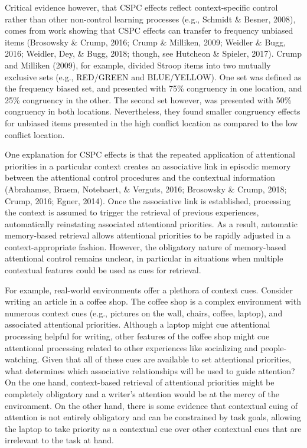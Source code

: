 \documentclass[english,,man,floatsintext]{apa6}
\begin{document}
Critical evidence however, that CSPC effects reflect context-specific control rather than other non-control learning processes (e.g., Schmidt \& Besner, 2008), comes from work showing that CSPC effects can transfer to frequency unbiased items (Brosowsky \& Crump, 2016; Crump \& Milliken, 2009; Weidler \& Bugg, 2016; Weidler, Dey, \& Bugg, 2018; though, see Hutcheon \& Spieler, 2017). Crump and Milliken (2009), for example, divided Stroop items into two mutually exclusive sets (e.g., RED/GREEN and BLUE/YELLOW). One set was defined as the frequency biased set, and presented with 75\% congruency in one location, and 25\% congruency in the other. The second set however, was presented with 50\% congruency in both locations. Nevertheless, they found smaller congruency effects for unbiased items presented in the high conflict location as compared to the low conflict location.

One explanation for CSPC effects is that the repeated application of attentional priorities in a particular context creates an associative link in episodic memory between the attentional control procedures and the contextual information (Abrahamse, Braem, Notebaert, \& Verguts, 2016; Brosowsky \& Crump, 2018; Crump, 2016; Egner, 2014). Once the associative link is established, processing the context is assumed to trigger the retrieval of previous experiences, automatically reinstating associated attentional priorities. As a result, automatic memory-based retrieval allows attentional priorities to be rapidly adjusted in a context-appropriate fashion. However, the obligatory nature of memory-based attentional control remains unclear, in particular in situations when multiple contextual features could be used as cues for retrieval.

For example, real-world environments offer a plethora of context cues. Consider writing an article in a coffee shop. The coffee shop is a complex environment with numerous context cues (e.g., pictures on the wall, chairs, coffee, laptop), and associated attentional priorities. Although a laptop might cue attentional processing helpful for writing, other features of the coffee shop might cue attentional processing related to other experiences like socializing and people-watching. Given that all of these cues are available to set attentional priorities, what determines which associative relationships will be used to guide attention? On the one hand, context-based retrieval of attentional priorities might be completely obligatory and a writer's attention would be at the mercy of the environment. On the other hand, there is some evidence that contextual cuing of attention is not entirely obligatory and can be constrained by task goals, allowing the laptop to take priority as a contextual cue over other contextual cues that are irrelevant to the task at hand.
\end{document}
